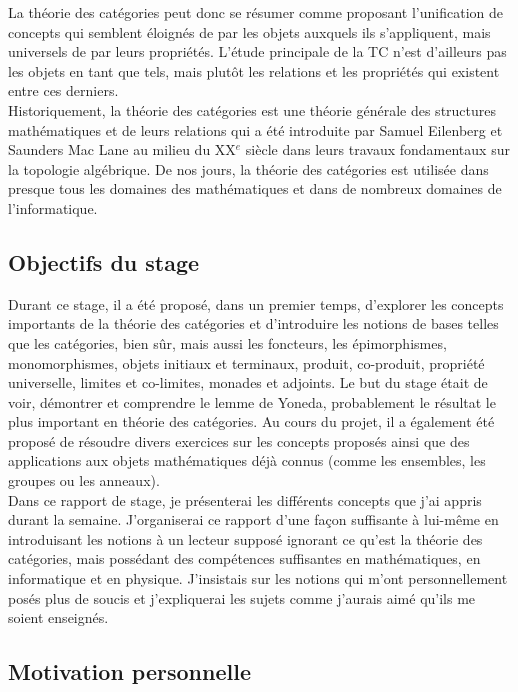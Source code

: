 \documentclass{article}
\begin{document}
La théorie des catégories peut donc se résumer comme proposant l'unification de concepts qui semblent éloignés de par les objets auxquels ils s'appliquent, mais universels de par leurs propriétés. L'étude principale de la TC n'est d'ailleurs pas les objets en tant que tels, mais plutôt les relations et les propriétés qui existent entre ces derniers.\\

Historiquement, la théorie des catégories est une théorie générale des structures mathématiques et de leurs relations qui a été introduite par Samuel Eilenberg et Saunders Mac Lane au milieu du XX$^e$ siècle dans leurs travaux fondamentaux sur la topologie algébrique. De nos jours, la théorie des catégories est utilisée dans presque tous les domaines des mathématiques et dans de nombreux domaines de l'informatique.

\subsection{Objectifs du stage}

Durant ce stage, il a été proposé, dans un premier temps, d'explorer les concepts importants de la théorie des catégories et d'introduire les notions de bases telles que les catégories, bien sûr, mais aussi les foncteurs, les épimorphismes, monomorphismes, objets initiaux et terminaux, produit, co-produit, propriété universelle, limites et co-limites, monades et adjoints. Le but du stage était de voir, démontrer et comprendre le lemme de Yoneda, probablement le résultat le plus important en théorie des catégories. Au cours du projet, il a également été proposé de résoudre divers exercices sur les concepts proposés ainsi que des applications aux objets mathématiques déjà connus (comme les ensembles, les groupes ou les anneaux).\\

Dans ce rapport de stage, je présenterai les différents concepts que j'ai appris durant la semaine. J'organiserai ce rapport d'une façon suffisante à lui-même en introduisant les notions à un lecteur supposé ignorant ce qu'est la théorie des catégories, mais possédant des compétences suffisantes en mathématiques, en informatique et en physique. J'insistais sur les notions qui m'ont personnellement posés plus de soucis et j'expliquerai les sujets comme j'aurais aimé qu'ils me soient enseignés.

\subsection{Motivation personnelle}
\end{document}
